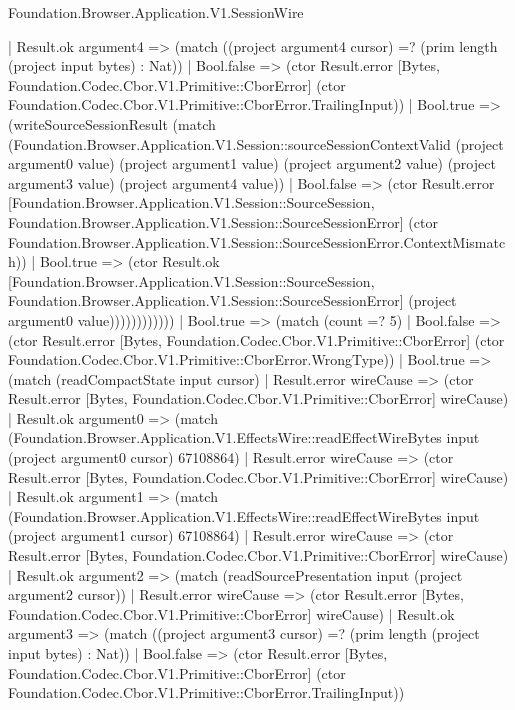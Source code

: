 \begin{lexlean}{Foundation.Browser.Application.V1.SessionWire}
\begin{semanticmodule}
{                                | Result.ok argument4 => (match ((project argument4 cursor) =? (prim length (project input bytes) : Nat))
                                  | Bool.false => (ctor Result.error [Bytes, Foundation.Codec.Cbor.V1.Primitive::CborError] (ctor Foundation.Codec.Cbor.V1.Primitive::CborError.TrailingInput))
                                  | Bool.true => (writeSourceSessionResult (match (Foundation.Browser.Application.V1.Session::sourceSessionContextValid (project argument0 value) (project argument1 value) (project argument2 value) (project argument3 value) (project argument4 value))
                                    | Bool.false => (ctor Result.error [Foundation.Browser.Application.V1.Session::SourceSession, Foundation.Browser.Application.V1.Session::SourceSessionError] (ctor Foundation.Browser.Application.V1.Session::SourceSessionError.ContextMismatch))
                                    | Bool.true => (ctor Result.ok [Foundation.Browser.Application.V1.Session::SourceSession, Foundation.Browser.Application.V1.Session::SourceSessionError] (project argument0 value))))))))))))
                  | Bool.true => (match (count =? 5)
                    | Bool.false => (ctor Result.error [Bytes, Foundation.Codec.Cbor.V1.Primitive::CborError] (ctor Foundation.Codec.Cbor.V1.Primitive::CborError.WrongType))
                    | Bool.true => (match (readCompactState input cursor)
                      | Result.error wireCause => (ctor Result.error [Bytes, Foundation.Codec.Cbor.V1.Primitive::CborError] wireCause)
                      | Result.ok argument0 => (match (Foundation.Browser.Application.V1.EffectsWire::readEffectWireBytes input (project argument0 cursor) 67108864)
                        | Result.error wireCause => (ctor Result.error [Bytes, Foundation.Codec.Cbor.V1.Primitive::CborError] wireCause)
                        | Result.ok argument1 => (match (Foundation.Browser.Application.V1.EffectsWire::readEffectWireBytes input (project argument1 cursor) 67108864)
                          | Result.error wireCause => (ctor Result.error [Bytes, Foundation.Codec.Cbor.V1.Primitive::CborError] wireCause)
                          | Result.ok argument2 => (match (readSourcePresentation input (project argument2 cursor))
                            | Result.error wireCause => (ctor Result.error [Bytes, Foundation.Codec.Cbor.V1.Primitive::CborError] wireCause)
                            | Result.ok argument3 => (match ((project argument3 cursor) =? (prim length (project input bytes) : Nat))
                              | Bool.false => (ctor Result.error [Bytes, Foundation.Codec.Cbor.V1.Primitive::CborError] (ctor Foundation.Codec.Cbor.V1.Primitive::CborError.TrailingInput))
}
\end{semanticmodule}
\end{lexlean}
